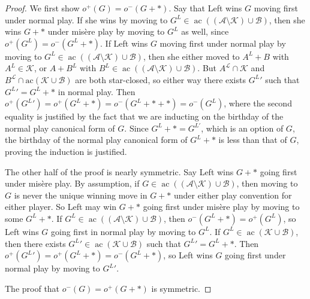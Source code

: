 \documentclass[10pt,a4paper]{amsart}
\DeclareMathOperator{\ac}{ac}
\begin{document}
\begin{proof}
    We first show $o^+(G) = o^-(G+*)$. Say that Left wins $G$ moving first under normal play. If she wins by moving to $G^L \in \ac( (\mathscr{A}\setminus \mathscr{K} )\cup \mathscr{B})$, then she wins $G+*$ under mis\`ere play by moving to $G^L$ as well, since $o^+(G^L) = o^-(G^L+*)$. If Left wins $G$ moving first under normal play by moving to $G^L \in \ac( (\mathscr{A}\setminus \mathscr{K} )\cup \mathscr{B})$, then she either moved to $A^L + B$ with $A^L \in \mathscr{K}$, or $A+B^L$ with $B^L \in \ac( (\mathscr{A}\setminus \mathscr{K} )\cup \mathscr{B})$. But $A^{\mathcal{L}} \cap  \mathscr{K}$ and $B^{\mathcal{L}}  \cap \text{ac}(\mathscr{K} \cup \mathscr{B})$ are both star-closed, so either way there exists ${G^L}'$ such that ${G^L}' = G^L+*$ in normal play. Then $o^+({G^L}') = o^+(G^L+*) = o^-(G^L+*+*) = o^-(G^L)$, where the second equality is justified by the fact that we are inducting on the birthday of the normal play canonical form of $G$. Since $G^L+* = G^{L'}$, which is an option of $G$, the birthday of the normal play canonical form of $G^L +*$ is less than that of $G$, proving the induction is justified.

The other half of the proof is nearly symmetric. Say Left wins $G+*$ going first under mis\`ere play. By assumption, if $G \in \ac((\mathscr{A}\setminus\mathscr{K} )\cup 
\mathscr{B})$, then moving to $G$ is never the unique winning move in $G+*$ under either play convention for either player. So Left may win $G+*$ going first under mis\`ere play by moving to some $G^L+*$. If $G^L \in \ac( (\mathscr{A}\setminus \mathscr{K} )\cup \mathscr{B})$, then $o^-(G^L+*) =o^+(G^L)$, so Left wins $G$ going first in normal play by moving to $G^L$. If $G^L \in \ac(  \mathscr{K} \cup \mathscr{B})$, then there exists ${G^L}' \in\ac(  \mathscr{K} \cup \mathscr{B})$ such that ${G^L}' = G^L+*$. Then $o^+({G^L}') =o^+(G^L+*) = o^-(G^L+*)$, so Left wins $G$ going first under normal play by moving to ${G^L}'$.

The proof that $o^-(G) = o^+(G+*)$ is symmetric.
\end{proof}
\end{document}
